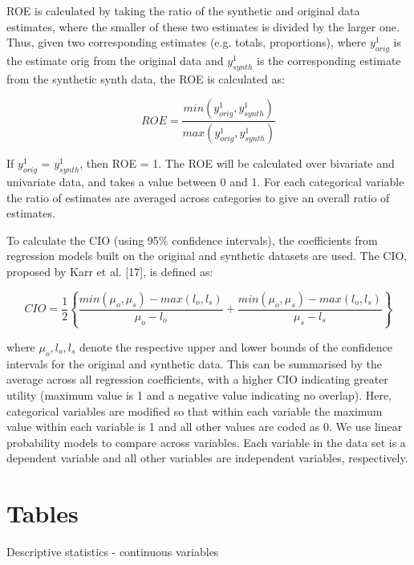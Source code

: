 \documentclass[12pt]{article}
\begin{document}
ROE is calculated by taking the ratio of the synthetic and original data estimates, where the smaller of these two estimates is divided by the larger one. Thus, given two corresponding estimates (e.g. totals, proportions), where $y^1_{orig}$ is the estimate orig from the original data and $y^1_{synth}$ is the corresponding estimate from the synthetic synth data, the ROE is calculated as:

\begin{equation}
    ROE = \frac{min(y^1_{orig},y^1_{synth})}{max(y^1_{orig},y^1_{synth})}
\end{equation}

If $y^1_{orig}$ = $y^1_{synth}$, then ROE = 1.  The ROE will be calculated over bivariate and univariate data, and takes a value between 0 and 1. For each categorical variable the ratio of estimates are averaged across categories to give an overall ratio of estimates.

To calculate the CIO (using 95\% confidence intervals), the coefficients from regression models built on the original and synthetic datasets are used. The CIO, proposed by Karr et al. [17], is defined as:

\begin{equation}
    CIO = \frac{1}{2}\left\{\frac{min(\mu_o,\mu_s)-max(l_o,l_s)}{\mu_o - l_o} + \frac{min(\mu_o,\mu_s)-max(l_o,l_s)}{\mu_s - l_s}\right\}
\end{equation}

where $\mu_o, l_o, l_s$ denote the respective upper and lower bounds of the confidence intervals for the original and synthetic data. This can be summarised by the average across all regression coefficients, with a higher CIO indicating greater utility (maximum value is 1 and a negative value indicating no overlap).  Here, categorical variables are modified so that within each variable the maximum value within each variable is 1 and all other values are coded as 0.  We use linear probability models to compare across variables.  Each variable in the data set is a dependent variable and all other variables are independent variables, respectively.

\section{Tables}
\begin{table}[!h]
    \caption{Descriptive statistics - continuous variables}
    \centering
    \resizebox{\textwidth}{!}{}
    \label{table_variables_continuous}
\end{table}
\end{document}
